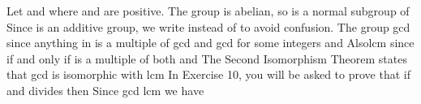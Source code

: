 \documentclass[11pt,oneside]{article}
\begin{document}
\begin{BookBody}
 Let  and  where  and  are positive. The group  is abelian, so  is a normal subgroup of  Since  is an additive group, we write  instead of  to avoid confusion. The group gcd since anything in  is a multiple of gcd and gcd for some integers  and  Alsolcm since  if and only if  is a multiple of both  and  The Second Isomorphism Theorem states that gcd 
is isomorphic with lcm In Exercise 10, you will be asked to prove that if  and  divides  then  Since \BookInline{\langle }gcd lcm we have 

\end{BookBody}

\BookNarrativetrue
\end{document}
